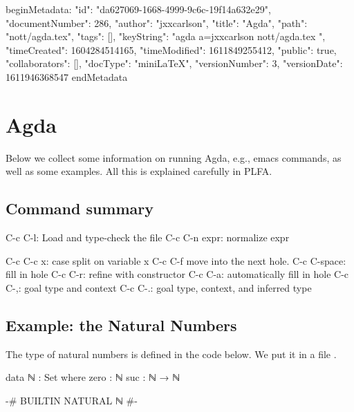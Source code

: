 beginMetadata:
{
    "id": "da627069-1668-4999-9c6c-19f14a632e29",
    "documentNumber": 286,
    "author": "jxxcarlson",
    "title": "Agda",
    "path": "nott/agda.tex",
    "tags": [],
    "keyString": "agda a=jxxcarlson nott/agda.tex ",
    "timeCreated": 1604284514165,
    "timeModified": 1611849255412,
    "public": true,
    "collaborators": [],
    "docType": "miniLaTeX",
    "versionNumber": 3,
    "versionDate": 1611946368547
}
endMetadata



\setcounter{section}{3}

\section{Agda}

\innertableofcontents



Below we collect some information on running Agda, e.g., emacs commands, as well as some examples.  All this is explained carefully in PLFA.

\subsection{Command summary}

\begin{colored}[bash]
C-c C-l: Load and type-check the file
C-c C-n expr: normalize expr

C-c C-c x: case split on variable x
C-c C-f move into the next hole.
C-c C-space: fill in hole
C-c C-r: refine with constructor
C-c C-a: automatically fill in hole
C-c C-,: goal type and context
C-c C-.: goal type, context, and inferred type
\end{colored}


\subsection{Example: the Natural Numbers}

The type of natural numbers is defined in the code below.  We put it in a file .

\begin{colored}[elm]
data ℕ : Set where
    zero : ℕ
    suc  : ℕ → ℕ
  
{-# BUILTIN NATURAL ℕ #-}
\end{colored}

